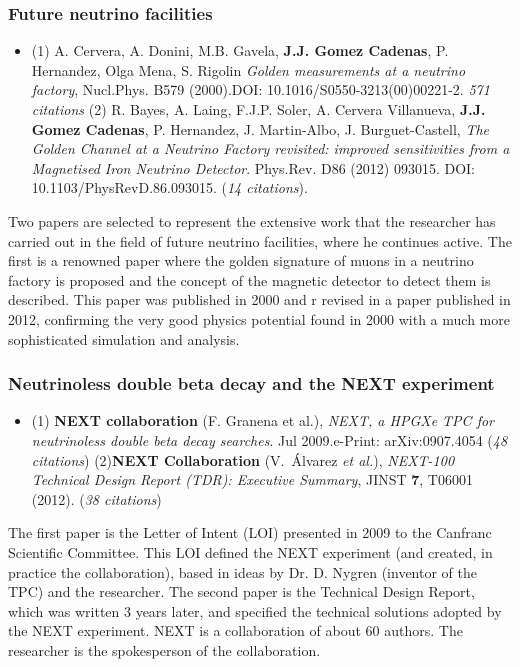 \subsubsection*{Future neutrino facilities}
%
\begin{itemize}
\item (1) A. Cervera, A. Donini, M.B. Gavela, {\bf J.J. Gomez Cadenas}, P. Hernandez, Olga Mena, S. Rigolin {\it Golden measurements at a neutrino factory}, 
Nucl.Phys. B579 (2000).DOI: 10.1016/S0550-3213(00)00221-2. {\it 571 citations}
(2) R. Bayes, A. Laing, F.J.P. Soler, A. Cervera Villanueva, {\bf J.J. Gomez Cadenas}, P. Hernandez, J. Martin-Albo, J. Burguet-Castell, {\it 
The Golden Channel at a Neutrino Factory revisited: improved sensitivities from a Magnetised Iron Neutrino Detector}. Phys.Rev. D86 (2012) 093015. DOI: 10.1103/PhysRevD.86.093015. 
({\it 14 citations}).
\end{itemize}
Two papers are selected to represent the extensive work that the researcher has carried out in the field of future neutrino facilities, where he continues active. The first is a renowned paper where the golden signature of muons in a neutrino factory is proposed and the concept of the magnetic detector to detect them is described. This paper was published in 2000 and r revised in a  paper published in 2012, confirming the very good physics potential found in 2000 with a much more sophisticated simulation and analysis.  

\subsubsection*{Neutrinoless double beta decay and the NEXT experiment}
\begin{itemize}
\item	(1) {\bf NEXT collaboration} (F. Granena et al.), \textit{NEXT, a HPGXe TPC for neutrinoless double beta decay searches}. Jul 2009.e-Print: arXiv:0907.4054 ({\it 48 citations}) 
(2){\bf NEXT Collaboration} (V.~\'Alvarez {\it et al.}), \textit{NEXT-100 Technical Design Report (TDR): Executive Summary}, JINST {\bf 7}, T06001 (2012). ({\it 38 citations})
\end{itemize}

The first paper is the Letter of Intent (LOI) presented in 2009 to the Canfranc Scientific Committee. This LOI defined the NEXT experiment (and created, in practice the collaboration), based in ideas by Dr. D. Nygren (inventor of the TPC) and the researcher. The second paper is the Technical Design Report, which was written 3 years later, and specified the technical solutions adopted by the NEXT experiment. NEXT is a collaboration of about 60 authors. The researcher is the spokesperson of the collaboration. 

